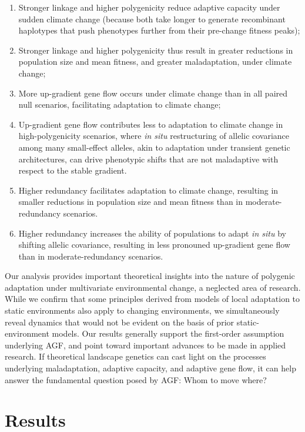 \documentclass[9pt,twocolumn,twoside,lineno]{pnas-new}
\begin{document}
\begin{enumerate}
    \item Stronger linkage and higher polygenicity reduce adaptive capacity under sudden climate change (because both take longer to generate recombinant haplotypes that push phenotypes further from their pre-change fitness peaks);
    \item Stronger linkage and higher polygenicity thus result in greater reductions in population size and mean fitness, and greater maladaptation, under climate change;
    \item More up-gradient gene flow occurs under climate change than in all paired null scenarios, facilitating adaptation to climate change;
    \item Up-gradient gene flow contributes less to adaptation to climate change in high-polygenicity scenarios, where \textit{in situ} restructuring of allelic covariance among many small-effect alleles, akin to adaptation under transient genetic architectures, can drive phenotypic shifts that are not maladaptive with respect to the stable gradient.
    \item Higher redundancy facilitates adaptation to climate change, resulting in smaller reductions in population size and mean fitness than in moderate-redundancy scenarios.
    \item Higher redundancy increases the ability of populations to adapt \textit{in situ} by shifting allelic covariance, resulting in less pronouned up-gradient gene flow than in moderate-redundancy scenarios.
\end{enumerate}


Our analysis provides important theoretical insights
into the nature of polygenic adaptation under multivariate environmental change,
a neglected area of research.
While we confirm that some principles derived from models of local adaptation to static environments
also apply to changing environments, we simultaneously
reveal dynamics that would not be evident on the basis of
prior static-environment models.
Our results generally support the first-order assumption underlying AGF,
and point toward important advances to be made in applied research.
If theoretical landscape genetics can cast 
light on the processes underlying maladaptation, adaptive capacity, and adaptive gene
flow, it can help answer the fundamental question posed by AGF: Whom to move where?


\section*{Results}
\end{document}
